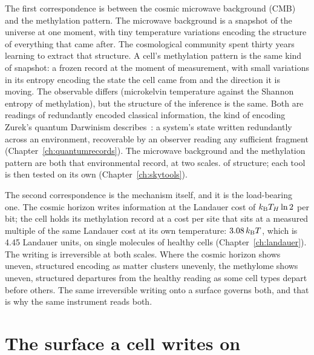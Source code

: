 The first correspondence is between the cosmic microwave background (CMB) and the methylation pattern. The microwave background is a
snapshot of the universe at one moment, with tiny temperature variations encoding the structure of everything that came after. The
cosmological community spent thirty years learning to extract that structure. A cell's methylation pattern is the same kind of snapshot:
a frozen record at the moment of measurement, with small variations in its entropy encoding the state the cell came from and the direction
it is moving. The observable differs (microkelvin temperature against the Shannon entropy of methylation), but the structure of the
inference is the same. Both are readings of redundantly encoded classical information, the kind of encoding Zurek's quantum Darwinism
describes~\cite{Zurek2009}: a system's state written redundantly across an environment, recoverable by an observer reading any sufficient
fragment (Chapter~\ref{ch:quantumrecords}). The microwave background and the methylation pattern are both that environmental record, at
two scales. \analogy{} of structure; each tool is then tested on its own (Chapter~\ref{ch:skytools}).

The second correspondence is the mechanism itself, and it is the load-bearing one. The cosmic horizon writes information at the
Landauer cost of $k_{\mathrm B} T_H\ln2$ per bit; the cell holds its methylation record at a cost per site that sits at a measured multiple of the
same Landauer cost at its own temperature: $3.08\,k_{\mathrm B} T$, which is 4.45 Landauer units, on single molecules of healthy cells
(Chapter~\ref{ch:landauer}). \measured{} The writing is irreversible at both scales. Where the cosmic horizon shows uneven, structured
encoding as matter clusters unevenly, the methylome shows uneven, structured departures from the healthy reading as some cell types
depart before others. The same irreversible writing onto a surface governs both, and that is why the same instrument reads both.
\conjecture

\section{The surface a cell writes on}\label{sec:ag_surface}


